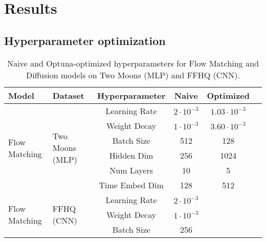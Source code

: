 \documentclass{article}
\begin{document}
\section{Results}

\subsection{Hyperparameter optimization}

\begin{table}[h]
	\centering
	\caption{Naive and Optuna-optimized hyperparameters for Flow Matching and Diffusion models on Two Moons (MLP) and FFHQ (CNN).}
	\begin{tabular}{llcccc}
		\toprule
		\textbf{Model}                 & \textbf{Dataset}                 & \textbf{Hyperparameter} & \textbf{Naive}     & \textbf{Optimized}  \\
		\midrule
		\multirow{6}{*}{Flow Matching} & \multirow{6}{*}{Two Moons (MLP)}
		                               & Learning Rate                    & $2\cdot10^{-3}$         & $1.03\cdot10^{-3}$                       \\
		                               &                                  & Weight Decay            & $1 \cdot 10^{-3}$  & $3.60\cdot 10^{-3}$ \\
		                               &                                  & Batch Size              & 512                & 128                 \\
		                               &                                  & Hidden Dim              & 256                & 1024                \\
		                               &                                  & Num Layers              & 10                 & 5                   \\
		                               &                                  & Time Embed Dim          & 128                & 512                 \\
		\midrule
		\multirow{6}{*}{Flow Matching} & \multirow{6}{*}{FFHQ (CNN)}
		                               & Learning Rate                    & $2\cdot10^{-3}$         &                                          \\
		                               &                                  & Weight Decay            & $1\cdot10^{-3}$    &                     \\
		                               &                                  & Batch Size              & 256                &                     \\

\end{tabular}
\end{table}
\end{document}
